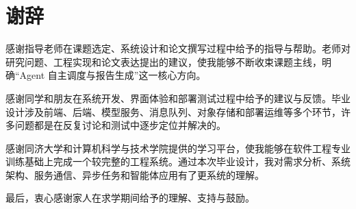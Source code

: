 \chapter*{谢辞}

感谢指导老师在课题选定、系统设计和论文撰写过程中给予的指导与帮助。老师对研究问题、工程实现和论文表达提出的建议，使我能够不断收束课题主线，明确“Agent 自主调度与报告生成”这一核心方向。

感谢同学和朋友在系统开发、界面体验和部署测试过程中给予的建议与反馈。毕业设计涉及前端、后端、模型服务、消息队列、对象存储和部署运维等多个环节，许多问题都是在反复讨论和测试中逐步定位并解决的。

感谢同济大学和计算机科学与技术学院提供的学习平台，使我能够在软件工程专业训练基础上完成一个较完整的工程系统。通过本次毕业设计，我对需求分析、系统架构、服务通信、异步任务和智能体应用有了更系统的理解。

最后，衷心感谢家人在求学期间给予的理解、支持与鼓励。
